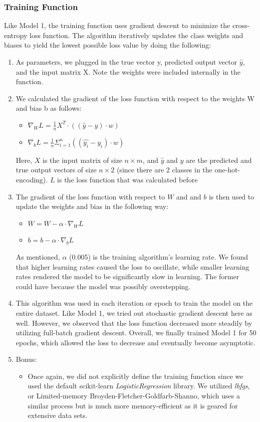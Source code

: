 \documentclass[11pt]{article}
\begin{document}
\subsubsection{Training Function}
Like Model 1, the training function uses gradient descent to minimize the cross-entropy loss function. The algorithm iteratively updates the class weights and biases to yield the lowest possible loss value by doing the following: 
\begin{enumerate}
    \item As parameters, we plugged in the true vector y, predicted output vector $\hat{y}$, and the input matrix X. Note the weights were included internally in the function. 
    \item We calculated the gradient of the loss function with respect to the weights W and bias b as follows:
    \begin{itemize}
        \item $\nabla_{W} L = \frac{1}{n} X^{T} \cdot ((\hat{y} - y) \cdot w)$
        \item $\nabla_{b} L = \frac{1}{n} \Sigma_{i=1}^{n} ((\hat{y_i} - y_i) \cdot w)$
    \end{itemize}
    Here, $X$ is the input matrix of size $n \times m$, and $\hat{y}$ and $y$ are the predicted and true output vectors of size $n \times 2$ (since there are 2 classes in the one-hot-encoding). $L$ is the loss function that was calculated before
    \item The gradient of the loss function with respect to $W$ and and $b$ is then used to update the weights and bias in the following way:
    \begin{itemize}
        \item $W = W - \alpha \cdot \nabla_{W} L$
        \item $b = b - \alpha \cdot \nabla_{b} L$
    \end{itemize}
    As mentioned, $\alpha$ (0.005) is the training algorithm's learning rate. We found that higher learning rates caused the loss to oscillate, while smaller learning rates rendered the model to be significantly slow in learning.  The former could have because the model was possibly overstepping. 
    \item This algorithm was used in each iteration or epoch to train the model on the entire dataset. Like Model 1, we tried out stochastic gradient descent here as well. However, we observed that the loss function decreased more steadily by utilizing full-batch gradient descent. Overall, we finally trained Model 1 for 50 epochs, which allowed the loss to decrease and eventually become asymptotic. 
    \item Bonus:
    \begin{itemize}
        \item Once again, we did not explicitly define the training function since we used the default scikit-learn \emph{LogisticRegression} library. We utilized \emph{lbfgs}, or Limited-memory Broyden-Fletcher-Goldfarb-Shanno, which uses a similar process but is much more memory-efficient as it is geared for extensive data sets. 
    \end{itemize}

\end{enumerate}
\end{document}

